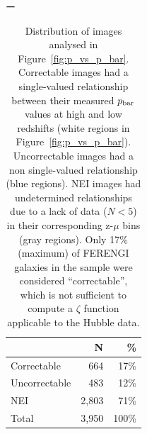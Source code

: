 \documentclass[usenatbib]{mn2e}
\begin{document}
\begin{table}ー
\caption{Distribution of \ferengi{} images analysed in Figure~\ref{fig:p_vs_p_bar}. Correctable images had a single-valued relationship between their measured $p_{\rm bar}$ values at high and low redshifts (white regions in Figure~\ref{fig:p_vs_p_bar}). Uncorrectable images had a non single-valued relationship (blue regions). NEI images had undetermined relationships due to a lack of data ($N<5$) in their corresponding z-$\mu$ bins (gray regions). Only 17\% (maximum) of FERENGI galaxies in the sample were considered ``correctable'', which is not sufficient to compute a $\zeta$ function applicable to the Hubble data.   \label{tbl:ferengi_bar_corrections}}
\begin{tabular}{lrr}
\hline \hline
				                   & N       & \% \\
\hline 
Correctable                        & 664   & 17\% \\
Uncorrectable                      & 483   & 12\% \\
NEI                                & 2,803     & 71\%\\
Total                              & 3,950   & 100\% \\
\hline \hline
\end{tabular}
\end{table}
\end{document}
